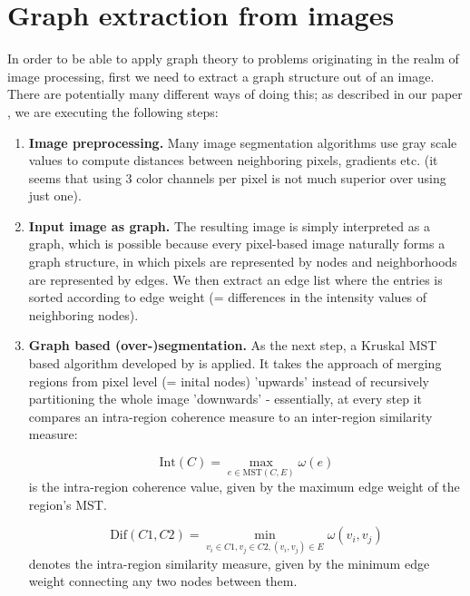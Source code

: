 \section{Graph extraction from images}
\label{sect:graph_ext}
	
	In order to be able to apply graph theory to problems originating in the realm of image processing, first we need to extract a graph structure out of an image. There are potentially many different ways of doing this; as described in our paper \citep{GraphExtractPaper}, we are executing the following steps:
	
	\begin{enumerate}
		\item \textbf{Image preprocessing.} Many image segmentation algorithms use gray scale values to compute distances between neighboring pixels, gradients etc. (it seems that using 3 color channels per pixel is not much superior over using just one).
		\item \textbf{Input image as graph.} The resulting image is simply interpreted as a graph, which is possible because every pixel-based image naturally forms a graph structure, in which pixels are represented by nodes and neighborhoods are represented by edges. We then extract an edge list where the entries is sorted according to edge weight (= differences in the intensity values of neighboring nodes).
		\item \textbf{Graph based (over-)segmentation.} As the next step, a Kruskal MST based algorithm developed by \citep{FelzenszwalbHuttenlocher2004} is applied. It takes the approach of merging regions from pixel level (= inital nodes) 'upwards' instead of recursively partitioning the whole image 'downwards' - essentially, at every step it compares an intra-region coherence measure to an inter-region similarity measure:
		
		\begin{equation*}
		\text{Int}(C) = \max\limits_{e \in \text{MST}(C,E)}  \omega(e)
		\end{equation*}
		is the intra-region coherence value, given by the maximum edge weight of the region's MST.
		
		\par
		\begin{equation*}
		\text{Dif}(C1,C2) = \min\limits_{v_i \in C1, v_j \in C2, (v_i,v_j) \in E} \omega(v_i,v_j)
		\end{equation*}
		denotes the intra-region similarity measure, given by the minimum edge weight connecting any two nodes between them.
		

\end{enumerate}
